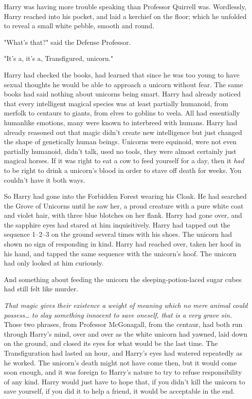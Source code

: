 Harry was having more trouble speaking than Professor Quirrell was. Wordlessly, 
Harry reached into his pocket, and laid a kerchief on the floor; which he 
unfolded to reveal a small white pebble, smooth and round.

"What's that?" said the Defense Professor.

"It's a, it's a, Transfigured, unicorn."

Harry had checked the books, had learned that since he was too young to have 
sexual thoughts he would be able to approach a unicorn without fear. The same 
books had said nothing about unicorns being smart. Harry had already noticed 
that every intelligent magical species was at least partially humanoid, from 
merfolk to centaurs to giants, from elves to goblins to veela. All had 
essentially humanlike emotions, many were known to interbreed with humans. 
Harry had already reasoned out that magic didn't create new intelligence but 
just changed the shape of genetically human beings. Unicorns were equinoid, 
were not even partially humanoid, didn't talk, used no tools, they were almost 
certainly just magical horses. If it was right to eat a cow to feed yourself 
for a day, then it \emph{had} to be right to drink a unicorn's blood in order 
to stave off death for weeks. You couldn't have it both ways.

So Harry had gone into the Forbidden Forest wearing his Cloak. He had searched 
the Grove of Unicorns until he saw her, a proud creature with a pure white coat 
and violet hair, with three blue blotches on her flank. Harry had gone over, 
and the sapphire eyes had stared at him inquisitively. Harry had tapped out the 
sequence 1--{2}--{3} on the ground several times with his shoes. The unicorn had 
shown no sign of responding in kind. Harry had reached over, taken her hoof in 
his hand, and tapped the same sequence with the unicorn's hoof. The unicorn had 
only looked at him curiously.

And something about feeding the unicorn the sleeping-potion-laced sugar cubes 
had still felt like murder.

\emph{That magic gives their existence a weight of meaning which no mere animal 
could possess{\ldots} to slay something innocent to save oneself, that is a 
very grave sin.} Those two phrases, from Professor McGonagall, from the 
centaur, had both run through Harry's mind, over and over as the white unicorn 
had yawned, laid down on the ground, and closed its eyes for what would be the 
last time. The Transfiguration had lasted an hour, and Harry's eyes had watered 
repeatedly as he worked. The unicorn's death might not have come then, but it 
would come soon enough, and it was foreign to Harry's nature to try to refuse 
responsibility of any kind. Harry would just have to hope that, if you didn't 
kill the unicorn to save yourself, if you did it to help a friend, it would be 
acceptable in the end.

